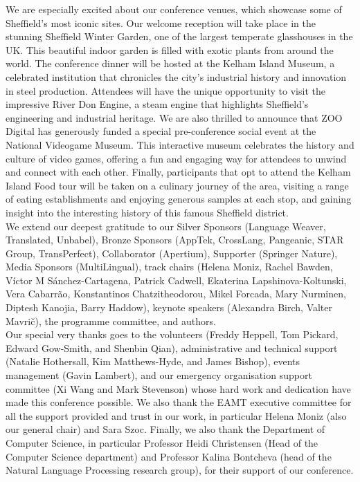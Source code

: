 We are especially excited about our conference venues, which showcase some of Sheffield’s most iconic sites. Our welcome reception will take place in the stunning Sheffield Winter Garden, one of the largest temperate glasshouses in the UK. This beautiful indoor garden is filled with exotic plants from around the world. The conference dinner will be hosted at the Kelham Island Museum, a celebrated institution that chronicles the city’s industrial history and innovation in steel production. Attendees will have the unique opportunity to visit the impressive River Don Engine, a steam engine that highlights Sheffield’s engineering and industrial heritage. We are also thrilled to announce that ZOO Digital has generously funded a special pre-conference social event at the National Videogame Museum. This interactive museum celebrates the history and culture of video games, offering a fun and engaging way for attendees to unwind and connect with each other. Finally, participants that opt to attend the Kelham Island Food tour will be taken on a culinary journey of the area, visiting a range of eating establishments and enjoying generous samples at each stop, and gaining insight into the interesting history of this famous Sheffield district.
\\

We extend our deepest gratitude to our Silver Sponsors (Language Weaver, Translated, Unbabel), Bronze Sponsors (AppTek, CrossLang, Pangeanic, STAR Group, TransPerfect), Collaborator (Apertium), Supporter (Springer Nature), Media Sponsors (MultiLingual), track chairs (Helena Moniz, Rachel Bawden, Víctor M Sánchez-Cartagena, Patrick Cadwell, Ekaterina Lapshinova-Koltunski, Vera Cabarrão, Konstantinos Chatzitheodorou, Mikel Forcada, Mary Nurminen, Diptesh Kanojia, Barry Haddow), keynote speakers (Alexandra Birch, Valter Mavrič), the programme committee, and authors.
\\

Our special very thanks goes to the volunteers (Freddy Heppell, Tom Pickard, Edward Gow-Smith, and Shenbin Qian), administrative and technical support (Natalie Hothersall, Kim Matthews-Hyde, and James Bishop), events management (Gavin Lambert), and our emergency organisation support committee (Xi Wang and Mark Stevenson) whose hard work and dedication have made this conference possible. We also thank the EAMT executive committee for all the support provided and trust in our work, in particular Helena Moniz (also our general chair) and Sara Szoc. Finally, we also thank the Department of Computer Science, in particular Professor Heidi Christensen (Head of the Computer Science department) and Professor Kalina Bontcheva (head of the Natural Language Processing research group), for their support of our conference. 
\\

